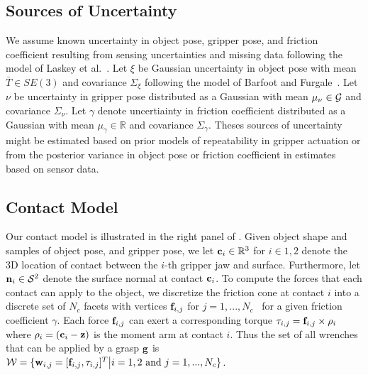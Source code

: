 \subsection{Sources of Uncertainty}
We assume known uncertainty in object pose, gripper pose, and friction coefficient resulting from sensing uncertainties and missing data following the model of Laskey et al.~\cite{laskey2015bandits}.
Let $\xi$ be Gaussian uncertainty in object pose with mean $\bar{T} \in SE(3)$ and covariance $\Sigma_{\xi}$ following the model of Barfoot and Furgale~\cite{barfoot2014associating}.
Let $\nu$ be uncertainty in gripper pose distributed as a Gaussian with mean $\mu_{\nu} \in \mathcal{G}$ and covariance $\Sigma_{\nu}$.
Let $\gamma$ denote uncertiainty in friction coefficient distributed as a Gaussian with mean $\mu_{\gamma} \in \mathbb{R}$ and covariance $\Sigma_{\gamma}$.
Theses sources of uncertainty might be estimated based on prior models of repeatability in gripper actuation or from the posterior variance in object pose or friction coefficient in estimates based on sensor data.

\subsection{Contact Model}
Our contact model is illustrated in the right panel of .
Given object shape and samples of object pose, and gripper pose, we let $\mathbf{c}_i \in \mathbb{R}^3$ for $i \in {1, 2}$ denote the 3D location of contact between the $i$-th gripper jaw and surface.
Furthermore, let $\mathbf{n}_i \in \mathcal{S}^2$ denote the surface normal at contact $\mathbf{c}_i$.
To compute the forces that each contact can apply to the object, we discretize the friction cone at contact $i$ into a discrete set of $N_c$ facets with vertices $\mathbf{f}_{i,j}$ for $j = 1, ..., N_c$~\cite{pokorny2013classical} for a given friction coefficient $\gamma$.
Each force $\mathbf{f}_{i,j}$ can exert a corresponding torque $\tau_{i,j} = \mathbf{f}_{i,j} \times \rho_i$ where $\rho_i = (\mathbf{c}_i - \mathbf{z})$ is the moment arm at contact $i$.
Thus the set of all wrenches that can be applied by a grasp $\mathbf{g}$ is $\mathcal{W} = \{ \mathbf{w}_{i,j} = [\mathbf{f}_{i,j}, \tau_{i,j}]^T \big| i = 1, 2 \text{ and } j = 1, ..., N_c\}$.


